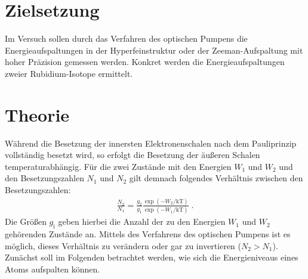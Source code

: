 \section{Zielsetzung}
Im Versuch sollen durch das Verfahren des optischen Pumpens die Energieaufspaltungen
in der Hyperfeinstruktur oder der Zeeman-Aufspaltung mit hoher Präzision gemessen werden.
Konkret werden die Energieaufspaltungen zweier Rubidium-Isotope ermittelt.

\section{Theorie}
Während die Besetzung der innersten Elektronenschalen nach dem Pauliprinzip vollständig besetzt
wird, so erfolgt die Besetzung der äußeren Schalen temperaturabhängig.
Für die zwei Zustände mit den Energien $W_1$ und $W_2$ und den Besetzungszahlen $N_1$ und
$N_2$ gilt demnach folgendes Verhältnis zwischen den Besetzungszahlen:
\begin{align*}
    \frac{N_{2}}{N_{1}} = \frac{g_{2}}{g_{1}}\frac{\exp(-W_{2}/\text{kT})}{\exp(-W_{1}/\text{kT})} \; .
\end{align*}
Die Größen $g_{\text{i}}$ geben hierbei die Anzahl der zu den Energien $W_1$ und $W_2$ gehörenden
Zustände an.
Mittels des Verfahrens des optischen Pumpens ist es möglich, dieses Verhältnis zu verändern
oder gar zu invertieren ($N_{2} > N_{1}$).
Zunächst soll im Folgenden betrachtet werden, wie sich die Energieniveaus eines Atoms aufspalten können.

